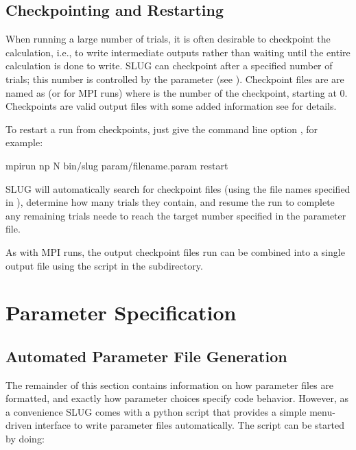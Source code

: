 \documentclass[letterpaper,10pt,english]{sphinxmanual}
\begin{document}
\section{Checkpointing and Restarting}
\label{\detokenize{running:checkpointing-and-restarting}}
When running a large number of trials, it is often desirable to checkpoint the calculation, i.e., to write intermediate outputs rather than waiting until the entire calculation is done to write. SLUG can checkpoint after a specified number of trials; this number is controlled by the  parameter (see {\hyperref[\detokenize{parameters:sec-parameters}]{}}). Checkpoint files are are named as  (or  for MPI runs) where  is the number of the checkpoint, starting at 0. Checkpoints are valid output files with some added information \textendash{} see {\hyperref[\detokenize{output:ssec-checkpoint-files}]{}} for details.

To restart a run from checkpoints, just give the command line option , for example:

\begin{sphinxVerbatim}[commandchars=\\\{\}]
mpirun \PYGZhy{}np N bin/slug param/filename.param \PYGZhy{}\PYGZhy{}restart
\end{sphinxVerbatim}

SLUG will automatically search for checkpoint files (using the file names specified in ), determine how many trials they contain, and resume the run to complete any remaining trials neede to reach the target number specified in the parameter file.

As with MPI runs, the output checkpoint files run can be combined into a single output file using the  script in the  subdirectory.


\chapter{Parameter Specification}
\label{\detokenize{parameters:parameter-specification}}\label{\detokenize{parameters:sec-parameters}}\label{\detokenize{parameters::doc}}

\section{Automated Parameter File Generation}
\label{\detokenize{parameters:automated-parameter-file-generation}}
The remainder of this section contains information on how parameter files are formatted, and exactly how parameter choices specify code behavior. However, as a convenience SLUG comes with a python script that provides a simple menu-driven interface to write parameter files automatically. The script can be started by doing:
\end{document}

